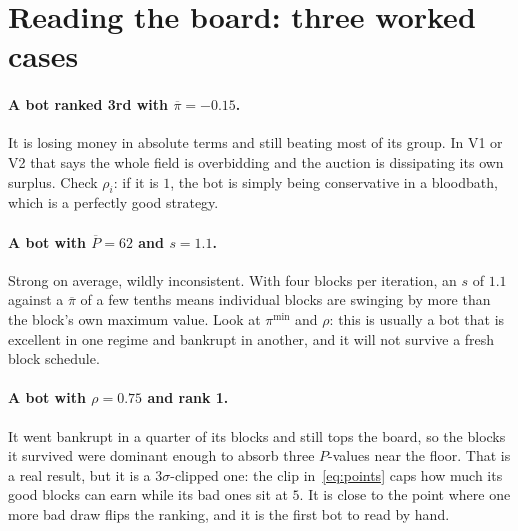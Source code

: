 \documentclass[11pt,a4paper]{article}
\newif\ifreleased
\begin{document}
\section{Reading the board: three worked cases}

\paragraph{A bot ranked 3rd with \texorpdfstring{$\overline{\pi} = -0.15$}{mean pi = -0.15}.}
It is losing money in absolute terms and still beating most of its group. In V1
or V2 that says the whole field is overbidding and the auction is dissipating its
own surplus.\ifreleased{} In V3 or V4 it is unremarkable: those are transfer
games, and the group's total $\pi$ cannot be positive in the branch where the
winner did not overpay.\fi{} Check $\rho_i$: if it is $1$, the bot is simply
being conservative in a bloodbath, which is a perfectly good strategy.

\paragraph{A bot with \texorpdfstring{$\overline{P} = 62$ and $s = 1.1$}{mean P = 62 and s = 1.1}.}
Strong on average, wildly inconsistent. With four blocks per iteration, an $s$
of $1.1$ against a $\overline{\pi}$ of a few tenths means individual blocks are
swinging by more than the block's own maximum value. Look at $\pi^{\min}$ and
$\rho$: this is usually a bot that is excellent in one regime and bankrupt in
another, and it will not survive a fresh block schedule.

\paragraph{A bot with \texorpdfstring{$\rho = 0.75$}{survival = 0.75} and rank 1.}
It went bankrupt in a quarter of its blocks and still tops the board, so the
blocks it survived were dominant enough to absorb three $P$-values near the
floor. That is a real result, but it is a $3\sigma$-clipped one: the clip
in~\eqref{eq:points} caps how much its good blocks can earn while its bad ones
sit at $5$. It is close to the point where one more bad draw flips the ranking,
and it is the first bot to read by hand.
\end{document}
